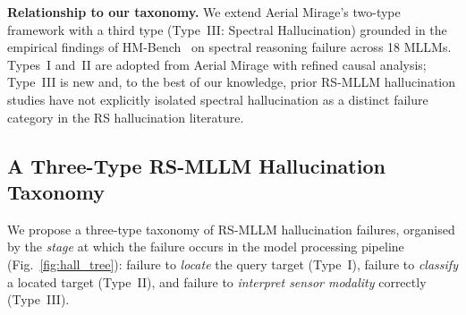 \textbf{Relationship to our taxonomy.}
We extend Aerial Mirage's two-type framework with a third type
(Type~III: Spectral Hallucination) grounded in the empirical findings of
HM-Bench~\cite{hmbench2026} on spectral reasoning failure across 18 MLLMs.
Types~I and~II are adopted from Aerial Mirage with refined causal analysis;
Type~III is new and, to the best of our knowledge, prior RS-MLLM hallucination
studies have not explicitly isolated spectral hallucination as a distinct
failure category in the RS hallucination literature.

\subsection{A Three-Type RS-MLLM Hallucination Taxonomy}\label{sec7:taxonomy}

We propose a three-type taxonomy of RS-MLLM hallucination failures,
organised by the \emph{stage} at which the failure occurs in the model
processing pipeline (Fig.~\ref{fig:hall_tree}): failure to \emph{locate}
the query target (Type~I), failure to \emph{classify} a located target
(Type~II), and failure to \emph{interpret sensor modality} correctly
(Type~III).

